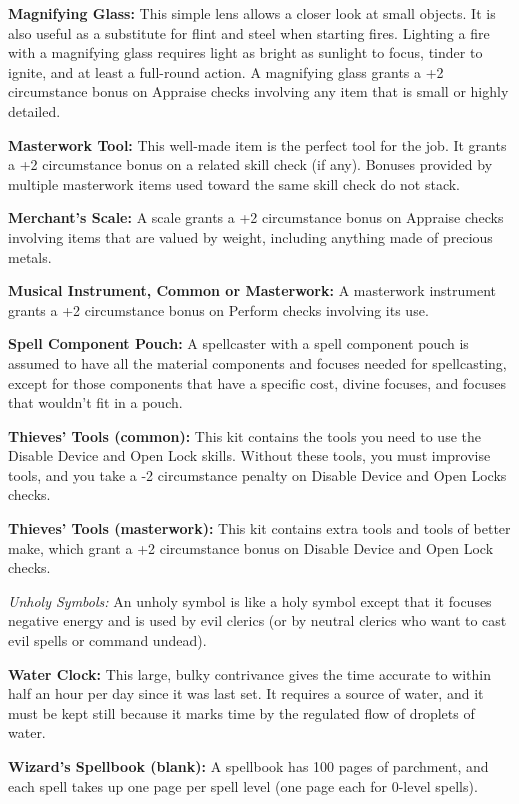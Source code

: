\begin{multicols}{2}
\textbf{Magnifying Glass:} This simple lens allows a closer look at small objects. 
It is also useful as a substitute for flint and steel when starting fires. Lighting 
a fire with a magnifying glass requires light as bright as sunlight to focus, tinder 
to ignite, and at least a full-round action. A magnifying glass grants a +2 circumstance 
bonus on Appraise checks involving any item that is small or highly detailed.

\textbf{Masterwork Tool:} This well-made item is the perfect tool for the job. 
It grants a +2 circumstance bonus on a related skill check (if any). Bonuses provided 
by multiple masterwork items used toward the same skill check do not stack.

\textbf{Merchant's Scale:} A scale grants a +2 circumstance bonus on Appraise 
checks involving items that are valued by weight, including anything made of precious 
metals.

\textbf{Musical Instrument, Common or Masterwork:} A masterwork instrument grants 
a +2 circumstance bonus on Perform checks involving its use.

\textbf{Spell Component Pouch:} A spellcaster with a spell component pouch is assumed 
to have all the material components and focuses needed for spellcasting, except 
for those components that have a specific cost, divine focuses, and focuses that 
wouldn't fit in a pouch.

\textbf{Thieves' Tools (common):} This kit contains the tools you need to use the Disable 
Device and Open Lock skills. Without these tools, you must improvise tools, and 
you take a -2 circumstance penalty on Disable Device and Open Locks checks.

\textbf{Thieves' Tools (masterwork):} This kit contains extra tools and tools of 
better make, which grant a +2 circumstance bonus on Disable Device and Open Lock 
checks.

\textit{Unholy Symbols:} An unholy symbol is like a holy symbol except that it 
focuses negative energy and is used by evil clerics (or by neutral clerics who 
want to cast evil spells or command undead).

\textbf{Water Clock:} This large, bulky contrivance gives the time accurate to 
within half an hour per day since it was last set. It requires a source of water, 
and it must be kept still because it marks time by the regulated flow of droplets 
of water.

\textbf{Wizard's Spellbook (blank):} A spellbook has 100 pages of parchment, and 
each spell takes up one page per spell level (one page each for 0-level spells).

\end{multicols}

